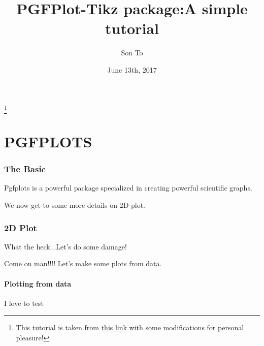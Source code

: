 \documentclass[a4paper,11pt]{article}
\author{Son To}
\date{June 13th, 2017}
\title{PGFPlot-Tikz package:A simple tutorial}
\begin{document}
  \maketitle
  \tableofcontents
  \clearpage
  \footnote{This
  tutorial is taken from
  \href{https://www.sharelatex.com/learn/Pgfplots_package#/The_document_preamble}{this link}
  with some modifications for personal pleasure!}
  \part{PGFPLOTS}
  \section{The Basic} \label{sec:1}
  Pgfplots is a powerful package specialized in creating
  powerful scientific \nolinebreak graphs.
  \hskip 5pt
We now get to some more details on 2D plot.
\clearpage
\section{2D Plot}
What the heck...Let's do some damage!


Come on man!!!! Let's make some plots from data.
\clearpage
\subsection{Plotting from data}
I love to test \textcelsius
\end{document}
